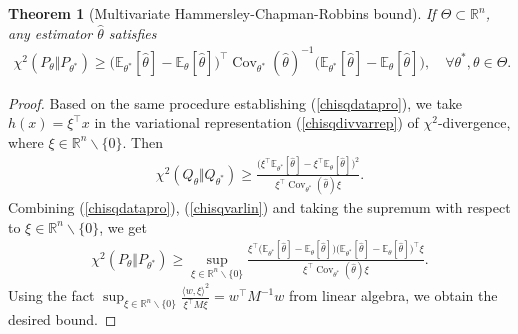 \documentclass{article}
\numberwithin{equation}{section}
\newcommand{\E}{\mathbb{E}}
\newcommand{\bbR}{\mathbb{R}}
\newcommand{\wh}{\widehat}
\DeclareMathOperator{\cov}{Cov}
\theoremstyle{plain}
\newtheorem{theorem}{Theorem}[section]
\theoremstyle{definition}
\begin{document}
\begin{theorem}[Multivariate Hammersley-Chapman-Robbins bound]
If $\Theta\subset\bbR^n$, any estimator $\wh\theta$ satisfies
	\begin{align*}
		\chi^2(P_\theta\Vert P_{\theta^*})\geq\bigl(\E_{\theta^*}[\wh{\theta}]-\E_{\theta}[\wh{\theta}]\bigr)^\top\cov_{\theta^*}(\wh{\theta})^{-1}\bigl(\E_{\theta^*}[\wh{\theta}]-\E_{\theta}[\wh{\theta}]\bigr),\quad\forall\theta^*,\theta\in\Theta.
	\end{align*}
\end{theorem}
\begin{proof}
Based on the same procedure establishing (\ref{chisqdatapro}), we take $h(x)=\xi^\top x$ in the variational representation (\ref{chisqdivvarrep}) of $\chi^2$-divergence, where $\xi\in\bbR^n\backslash\{0\}$. Then
\begin{align}
	\chi^2(Q_\theta\Vert Q_{\theta^*})\geq\frac{\bigl(\xi^\top\E_{\theta^*}[\wh{\theta}]-\xi^\top\E_{\theta}[\wh{\theta}]\bigr)^2}{\xi^\top\cov_{\theta^*}(\wh{\theta})\xi}.\label{chisqvarmullin}
\end{align}
Combining (\ref{chisqdatapro}), (\ref{chisqvarlin}) and taking the supremum with respect to $\xi\in\bbR^n\backslash\{0\}$, we get
	\begin{align*}
		\chi^2(P_\theta\Vert P_{\theta^*})\geq\sup_{\xi\in\bbR^n\backslash\{0\}}\frac{\xi^\top\bigl(\E_{\theta^*}[\wh{\theta}]-\E_{\theta}[\wh{\theta}]\bigr)\bigl(\E_{\theta^*}[\wh{\theta}]-\E_{\theta}[\wh{\theta}]\bigr)^\top\xi}{\xi^\top\cov_{\theta^*}(\wh{\theta})\xi}.
	\end{align*}
Using the fact $\sup_{\xi\in\bbR^n\backslash\{0\}}\frac{\langle w,\xi\rangle^2}{\xi^\top M\xi}=w^\top M^{-1}w$ from linear algebra, we obtain the desired bound. 
\end{proof}
\end{document}

